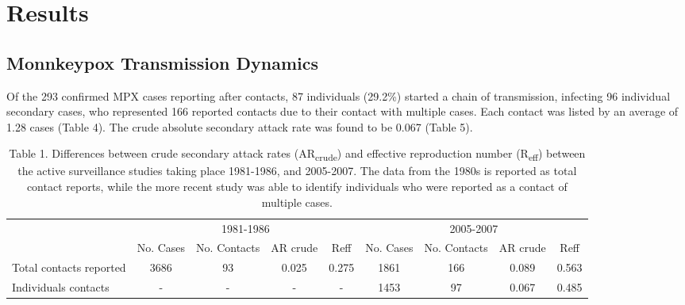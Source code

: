\section{Results}

\subsection*{Monnkeypox Transmission Dynamics}
Of the 293 confirmed MPX cases reporting after contacts, 87 individuals (29.2\%) started a chain of transmission, infecting 96 individual secondary cases, who represented 166 reported contacts due to their contact with multiple cases. Each contact was listed by an average of 1.28 cases (Table 4). The crude absolute secondary attack rate was found to be 0.067 (Table 5).



\begin{table}[!ht]
        \footnotesize
        \caption{Table 1. Differences between crude secondary attack rates (AR\textsubscript{crude}) and effective reproduction number (R\textsubscript{eff}) between the active surveillance studies taking place 1981-1986, and 2005-2007. The data from the 1980s is reported as total contact reports, while the more recent study was able to identify individuals who were reported as a contact of multiple cases.}
        \label{tab:table}
        \centering
        \begin{tabular}{lcccccccc} 
        \toprule
         & \multicolumn{4}{c}{1981-1986} & \multicolumn{4}{c}{2005-2007} \\ %
\cmidrule(r){2-5} %
\cmidrule(l){6-9}
 & No. Cases & No. Contacts & AR crude & Reff & No. Cases & No. Contacts & AR crude & Reff\\ %
\midrule %
Total contacts reported & 3686 & 93 & 0.025 & 0.275 & 1861 & 166 & 0.089 & 0.563\\ 
Individuals contacts & - & - & - & - & 1453 & 97 & 0.067 & 0.485\\ \bottomrule
        \end{tabular}
      \end{table}